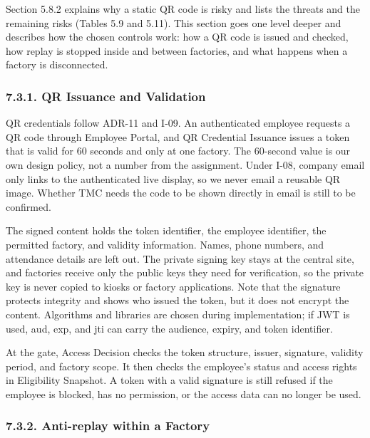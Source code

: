 {}

Section 5.8.2 explains why a static QR code is risky and lists the threats and the remaining risks (Tables 5.9 and 5.11). This section goes one level deeper and describes how the chosen controls work: how a QR code is issued and checked, how replay is stopped inside and between factories, and what happens when a factory is disconnected.

\subsubsection*{7.3.1. QR Issuance and Validation}

{}

QR credentials follow ADR-11 and I-09. An authenticated employee requests a QR code through Employee Portal, and QR Credential Issuance issues a token that is valid for 60 seconds and only at one factory. The 60-second value is our own design policy, not a number from the assignment. Under I-08, company email only links to the authenticated live display, so we never email a reusable QR image. Whether TMC needs the code to be shown directly in email is still to be confirmed.

The signed content holds the token identifier, the employee identifier, the permitted factory, and validity information. Names, phone numbers, and attendance details are left out. The private signing key stays at the central site, and factories receive only the public keys they need for verification, so the private key is never copied to kiosks or factory applications. Note that the signature protects integrity and shows who issued the token, but it does not encrypt the content. Algorithms and libraries are chosen during implementation; if JWT is used, aud, exp, and jti can carry the audience, expiry, and token identifier.

At the gate, Access Decision checks the token structure, issuer, signature, validity period, and factory scope. It then checks the employee's status and access rights in Eligibility Snapshot. A token with a valid signature is still refused if the employee is blocked, has no permission, or the access data can no longer be used.

\subsubsection*{7.3.2. Anti-replay within a Factory}


